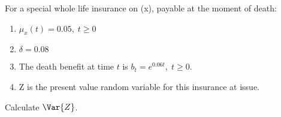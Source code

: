 For a special whole life insurance on (x), payable at the moment of death:
\begin{enumerate}
\item $\mu_x(t) = 0.05, \; t\geq 0$
\item $\delta = 0.08$
\item The death benefit at time $t$ is $b_t=e^{0.06t}, \; t\geq 0$.
\item Z is the present value random variable for this insurance at issue.
\end{enumerate}
Calculate $\Var{Z}$.
